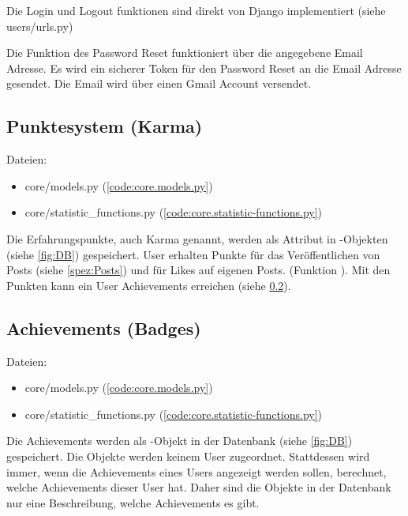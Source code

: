 Die Login und Logout funktionen sind direkt von Django implementiert (siehe users/urls.py)

Die Funktion des Password Reset funktioniert über die angegebene Email Adresse.
Es wird ein sicherer Token für den Password Reset an die Email Adresse gesendet.
Die Email wird über einen Gmail Account versendet.


\subsection{Punktesystem (Karma)} \label{spez:Karma}

Dateien:
\begin{itemize}
    \item core/models.py (\ref{code:core.models.py})
    \item core/statistic\_functions.py (\ref{code:core.statistic-functions.py})
\end{itemize}

Die Erfahrungspunkte, auch Karma genannt, werden als Attribut in
-Objekten (siehe \ref{fig:DB}) gespeichert. User erhalten Punkte
für das Veröffentlichen von Posts (siehe \ref{spez:Posts}) und für Likes auf
eigenen Posts. (Funktion ). Mit den Punkten kann
ein User Achievements erreichen (siehe \ref{spez:Badges}).

\subsection{Achievements (Badges)} \label{spez:Badges}

Dateien:
\begin{itemize}
    \item core/models.py (\ref{code:core.models.py})
    \item core/statistic\_functions.py (\ref{code:core.statistic-functions.py})
\end{itemize}

Die Achievements werden als -Objekt in der Datenbank (siehe
\ref{fig:DB}) gespeichert. Die Objekte werden keinem User zugeordnet.
Stattdessen wird immer, wenn die Achievements eines Users angezeigt werden
sollen, berechnet, welche Achievements dieser User hat. Daher sind die Objekte
in der Datenbank nur eine Beschreibung, welche Achievements es gibt.

